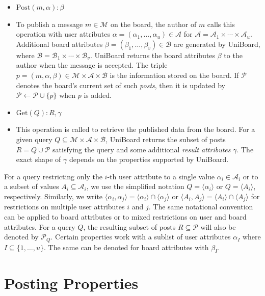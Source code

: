 \documentclass[bibtotoc,halfparskip,oneside]{scrreprt}
\begin{document}
	\begin{itemize}
		\item $\mathrm{Post}(m,\alpha):\beta$
		\item[]  To publish a message $m \in \mathcal{M}$ on the board, the author of $m$ calls this operation with user attributes $\alpha=(\alpha_1,\dots,\alpha_u)\in\mathcal{A}$ for $\mathcal{A}=\mathcal{A}_1\times\cdots\times\mathcal{A}_u$. Additional board attributes $\beta=(\beta_1,\dots,\beta_v)\in\mathcal{B}$ are generated by UniBoard, where $\mathcal{B}=\mathcal{B}_1\times\cdots\times\mathcal{B}_v$. UniBoard returns the board attributes $\beta$ to the author when the message is accepted. The triple $p=(m,\alpha,\beta)\in\mathcal{M}\times\mathcal{A}\times\mathcal{B}$ is the information stored on the board. If $\mathcal{P}$ denotes the board's current set of such \emph{posts}, then it is updated by $\mathcal{P}\leftarrow \mathcal{P}\cup\{p\}$ when $p$ is added. 
		\item $\mathrm{Get}(Q):R, \gamma$ 
		\item[] This operation is called to retrieve the published data from the board. For a given query $Q\subseteq\mathcal{M}\times\mathcal{A}\times\mathcal{B}$, UniBoard returns the subset of posts $R=Q\cup\mathcal{P}$ satisfying the query and some additional \emph{result attributes} $\gamma$. The exact shape of $\gamma$ depends on the properties supported by UniBoard.
		
	\end{itemize}
	For a query restricting only the $i$-th user attribute to a single value $\alpha_i\in \mathcal{A}_i$ or to a subset of values $A_i\subseteq \mathcal{A}_i$, we use the simplified notation $Q=\langle\alpha_i\rangle$ or $Q=\langle A_i\rangle$, respectively. Similarly, we write $\langle\alpha_i,\alpha_j\rangle=\langle\alpha_i\rangle\cap\langle\alpha_j\rangle$ or $\langle A_i,A_j\rangle=\langle A_i\rangle\cap\langle A_j\rangle$ for restrictions on multiple user attributes $i$ and $j$. The same notational convention can be applied to board attributes or to mixed restrictions on user and board attributes. For a query $Q$, the resulting subset of posts $R\subseteq \mathcal{P}$ will also be denoted by $\mathcal{P}_Q$.\newline
	Certain properties work with a sublist of user attributes $\alpha_I$ where $I\subseteq\{1,\dots, u\}$. The same can be denoted for board attributes with $\beta_I$.
	\section{Posting Properties}\label{ub2}
	
\end{document}
